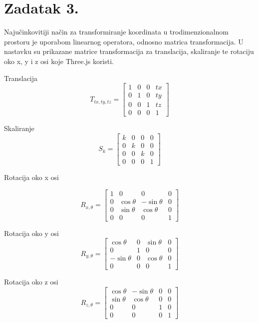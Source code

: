 \documentclass[a4paper,12pt]{article}
\begin{document}
\pagebreak


\section{Zadatak 3.}
Najučinkovitiji način za transformiranje koordinata u trodimenzionalnom prostoru je uporabom
linearnog operatora, odnosno matrica transformacija. U nastavku su prikazane matrice transformacija
za translacija, skaliranje te rotaciju oko x, y i z osi koje Three.js koristi.

Translacija
\[
T_{tx,ty,tz}=
\begin{bmatrix}
    1 & 0 & 0 & tx \\
    0 & 1 & 0 & ty \\
    0 & 0 & 1 & tz \\
    0 & 0 & 0 & 1
\end{bmatrix}
\]

Skaliranje
\[
S_{k}=
\begin{bmatrix}
    k & 0 & 0 & 0 \\
    0 & k & 0 & 0 \\
    0 & 0 & k & 0 \\
    0 & 0 & 0 & 1
\end{bmatrix}
\]

Rotacija oko x osi

\[
R_{x,\theta}=
\begin{bmatrix}
    1 & 0 & 0 & 0 \\
    0 & \cos{\theta} & -\sin{\theta} & 0 \\
    0 & \sin{\theta} & \cos{\theta} & 0 \\
    0 & 0 & 0 & 1
\end{bmatrix}
\]

Rotacija oko y osi
\[
R_{y,\theta}=
\begin{bmatrix}
    \cos{\theta} & 0 & \sin{\theta} & 0 \\
    0 & 1 & 0 & 0 \\
    -\sin{\theta} & 0 & \cos{\theta} & 0 \\
    0 & 0 & 0 & 1
\end{bmatrix}
\]

Rotacija oko z osi
\[
R_{z,\theta}=
\begin{bmatrix}
    \cos{\theta} & -\sin{\theta} & 0 & 0 \\
    \sin{\theta} & \cos{\theta} & 0 & 0 \\
    0 & 0 & 1 & 0 \\
    0 & 0 & 0 & 1
\end{bmatrix}
\]
\end{document}
